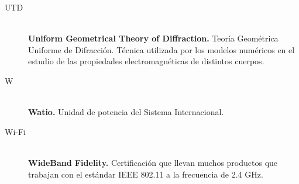 \begin{description}
    \item[UTD]\mbox{}\\
    \textbf{Uniform Geometrical Theory of Diffraction.} Teoría Geométrica Uniforme de Difracción. Técnica utilizada por los modelos numéricos en el estudio de las propiedades electromagnéticas de distintos cuerpos.

    \item[W]\mbox{}\\
    \textbf{Watio.} Unidad de potencia del Sistema Internacional.

    \item[Wi-Fi]\mbox{}\\
    \textbf{WideBand Fidelity.} Certificación que llevan muchos productos que trabajan con el estándar IEEE 802.11 a la frecuencia de 2.4 GHz.

\end{description}
